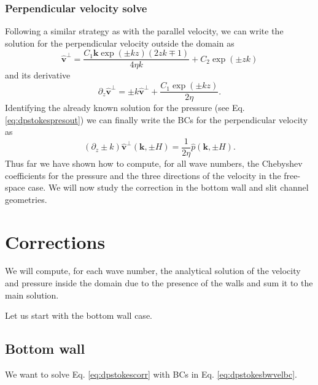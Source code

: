 \documentclass[twoside,openright,titlepage,numbers=noenddot,%
headinclude,footinclude,cleardoublepage=empty,abstract=on,
BCOR=5mm,fontsize=11pt, dvipsnames, paper=b5
]{scrreprt}
\renewcommand{\vec}[1]{\bm{#1}}
\newcommand{\fou}[1]{\widehat{#1}}
\newcommand{\fvel}{v}
\begin{document}
\subsubsection*{Perpendicular velocity solve}
Following a similar strategy as with the parallel velocity, we can write the solution for the perpendicular velocity outside the domain as
\begin{equation}
    \label{eq:dpstokesperpvel}
  \fou{\vec{\fvel}}^{\perp} = \frac{C_1\vec{k}\exp(\pm kz)\left(2zk\mp 1\right)}{4\eta k} + C_2\exp(\pm zk)
\end{equation}
and its derivative
\begin{equation}
  \label{eq:dpstokesperpvelder}
  \partial_z\fou{\vec{\fvel}}^{\perp} = \pm k\fou{\vec{\fvel}}^{\perp} + \frac{C_1\exp(\pm kz)}{2\eta}.
\end{equation}
Identifying the already known solution for the pressure (see Eq. \eqref{eq:dpstokespresout}) we can finally write the \glspl{BC} for the perpendicular velocity as
\begin{equation}
  \label{eq:dpstokesperpvelbc}
  \left(\partial_z\pm k\right)\fou{\vec{\fvel}}^\perp(\vec{k}, \pm H) = \frac{1}{2\eta}\fou{p}(\vec{k}, \pm H).
\end{equation}
Thus far we have shown how to compute, for all wave numbers, the Chebyshev coefficients for the pressure and the three directions of the velocity in the free-space case. We will now study the correction in the bottom wall and slit channel geometries.
\section{Corrections}
We will compute, for each wave number, the analytical solution of the velocity and pressure inside the domain due to the presence of the walls and sum it to the main solution.

Let us start with the bottom wall case.
\subsection*{Bottom wall}

We want to solve Eq. \eqref{eq:dpstokescorr} with \glspl{BC} in Eq. \eqref{eq:dpstokesbwvelbc}.
\end{document}

